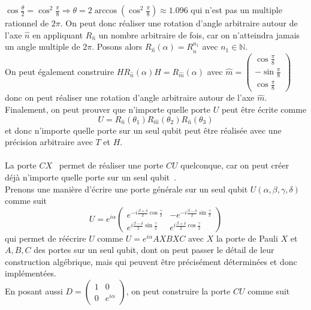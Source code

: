 $\cos \frac{\theta}{2} = \cos^2 \frac{\pi}{8} \Rightarrow \theta = 2 \arccos ( \cos^2
\frac{\pi}{8} ) \approx 1.096$ qui n'est pas un multiple rationnel de $2 \pi$.
On peut donc réaliser une rotation d'angle arbitraire autour de l'axe $\hat{n}$ en
appliquant $R_{\hat{n}}$ un nombre arbitraire de fois, car on n'atteindra jamais
un angle multiple de $2 \pi$.
Posons alors $R_{\hat{n}} (\alpha) = R_{\hat{n}}^{n_1}$ avec $n_1 \in \mathbb{N}$.\\
On peut également construire $H R_{\hat{n}} (\alpha) H = R_{\hat{m}} (\alpha)$ avec
$\hat{m} = \begin{pmatrix}
\cos \frac{\pi}{8} \\
-\sin \frac{\pi}{8} \\
\cos \frac{\pi}{8}
\end{pmatrix}$ donc on peut réaliser une rotation d'angle arbitraire autour de
l'axe $\hat{m}$.\\
Finalement, on peut prouver que n'importe quelle porte $U$ peut être écrite comme
\[U = R_{\hat{n}} (\theta_1) R_{\hat{m}} (\theta_2) R_{\hat{n}} (\theta_3) \]
et donc n'importe quelle porte sur un seul qubit peut être réalisée avec une précision
arbitraire avec $T$ et $H$.\\ \\
La porte $CX$~\cite{Rosenblum2018,Noh2018} permet de réaliser une porte $CU$ quelconque, car on peut créer déjà
n'importe quelle porte sur un seul qubit~\cite{univ-double}.\\
Prenons une manière d'écrire une porte générale sur un seul qubit $U(\alpha, \beta,
\gamma, \delta)$ comme suit
\[
    U = e^{i \alpha} \begin{pmatrix}
        e^{-i \frac{\beta + \delta}{2} \cos \frac{\gamma}{2}} & - e^{-i \frac{\beta - \delta}{2} \sin \frac{\gamma}{2}} \\
        e^{i \frac{\beta - \delta}{2} \sin \frac{\gamma}{2}} & e^{i \frac{\beta + \delta}{2} \cos \frac{\gamma}{2}}
    \end{pmatrix}
\]
qui permet de réécrire $U$ comme $U = e^{i \alpha} A X B X C$ avec
$X$ la porte de Pauli $X$ et $A, B, C$ des portes sur un seul qubit, dont on peut
passer le détail de leur construction algébrique, mais qui peuvent être précisément
déterminées et donc implémentées.\\
En posant aussi $D = \begin{pmatrix}
1 & 0 \\
0 & e^{i \alpha}
\end{pmatrix}$, on peut construire la porte $CU$ comme suit
